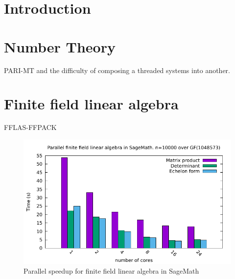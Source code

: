 \documentclass{deliverablereport}
\author{Author names}
\begin{document}
\maketitle
\githubissuedescription



\section{Introduction}

\section{Number Theory}

PARI-MT and the difficulty of composing a threaded systems into another.

\section{Finite field linear algebra}
FFLAS-FFPACK

\begin{figure}
  \begin{center}
    \includegraphics[width=.6\textwidth]{Pictures/histo_luke43}
    \caption{Parallel speedup for finite field linear algebra in SageMath}
  \end{center}
\end{figure}
\end{document}
